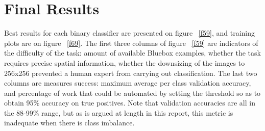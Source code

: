\documentclass[a4paper,11pt]{article}
\begin{document}
%
%
%
%
%
%
%
\section{Final Results}

Best results for each binary classifier are presented on figure ~\ref{f59}, and training plots are on figure ~\ref{f69}. The first three columns of figure ~\ref{f59} are indicators of the difficulty of the task: amount of available Bluebox examples, whether the task requires precise spatial information, whether the downsizing of the images to 256x256 prevented a human expert from carrying out classification. The last two columns are measures success: maximum average per class validation accuracy, and percentage of work that could be automated by setting the threshold so as to obtain 95\% accuracy on true positives. Note that validation accuracies are all in the 88-99\% range, but as is argued at length in this report, this metric is inadequate when there is class imbalance. \\
\end{document}

